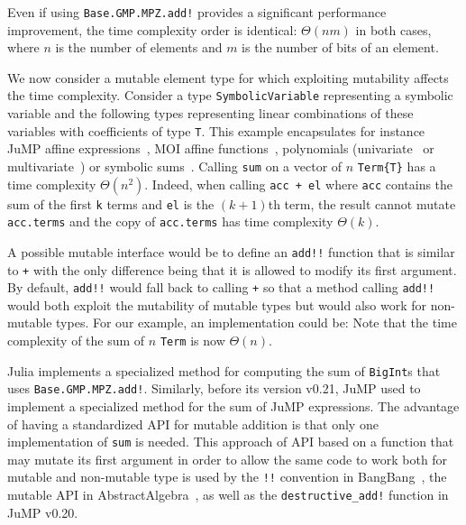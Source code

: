 \documentclass{juliacon}
\begin{document}
Even if using \lstinline|Base.GMP.MPZ.add!| provides a significant performance improvement,
the time complexity order is identical: $\Theta(nm)$ in both cases,
where $n$ is the number of elements and $m$ is the number of bits of an element.

We now consider a mutable element type for which exploiting mutability affects the time complexity.
Consider a type \lstinline|SymbolicVariable| representing a symbolic variable
and the following types representing linear combinations of these variables with coefficients of type \lstinline|T|.
This example encapsulates for instance JuMP affine expressions~\cite{dunning2017jump}, MOI affine functions~\cite{legat2021mathoptinterface}, polynomials (univariate~\cite{verzani2021polynomials} or multivariate~\cite{legat2023multivariate}) or symbolic sums~\cite{gowda2021high}.
Calling \lstinline|sum| on a vector of $n$ \lstinline|Term{T}| has a time complexity $\Theta(n^2)$.
Indeed, when calling \lstinline|acc + el| where \lstinline|acc| contains the sum of the first \lstinline|k| terms and \lstinline|el| is the $(k+1)$th term,
the result cannot mutate \lstinline|acc.terms| and the copy of \lstinline|acc.terms| has time complexity $\Theta(k)$.

A possible mutable interface would be to define an \lstinline|add!!| function
that is similar to \lstinline|+| with the only difference being that it
is allowed to modify its first argument.
By default, \lstinline|add!!| would fall back to calling \lstinline|+|
so that a method calling \lstinline|add!!| would both exploit the mutability
of mutable types but would also work for non-mutable types.
For our example, an implementation could be:
Note that the time complexity of the sum of $n$ \lstinline|Term| is now $\Theta(n)$.

Julia implements a specialized method for computing the sum of \lstinline|BigInt|s that uses \lstinline|Base.GMP.MPZ.add!|.
Similarly, before its version v0.21, JuMP used to implement a specialized method for the sum of JuMP expressions.
The advantage of having a standardized API for mutable addition is that
only one implementation of \lstinline|sum| is needed.
This approach of API based on a function that may mutate its first argument in order to allow the same code to work both for mutable and non-mutable type is
used by the \lstinline|!!| convention in BangBang~\cite{takafumi2021bangbang},
the mutable API in AbstractAlgebra~\cite{AbstractAlgebra.jl-2017},
as well as the \lstinline|destructive_add!| function in JuMP v0.20.
\end{document}
